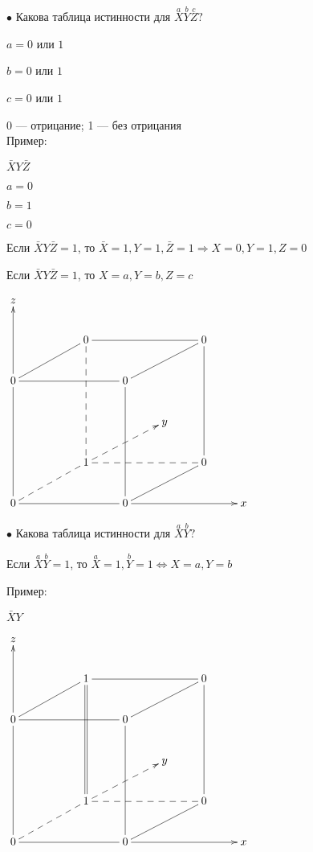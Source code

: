 \documentclass[a4paper, 12pt] {article}
\begin{document}
$ \bullet $ Какова таблица истинности для $ \stackrel{a}{X} \stackrel{b}{Y} \stackrel{c}{Z} ? $

$ a = 0 $ или $ 1 $

$ b = 0 $ или $ 1 $

$ c = 0 $ или $ 1 $

0 --- отрицание; 1 --- без отрицания\\

Пример:

$ \bar X Y \bar Z $

$ a = 0 $

$ b = 1 $

$ c = 0 $

Если $ \bar X Y \bar Z =1$, то $ \bar X =1, Y =1, \bar Z =1 \Rightarrow X =0, Y =1, Z =0 $

Если $ \bar X Y \bar Z =1$, то $ X =a, Y =b, Z =c $

$ 
\begin{matrix}
	\xymatrix{
		z &   &  &   & & &\\
		&   & 0 \ar@{-}[lld] \ar@{--}[ddd] &   & & 0 \ar@{-}[lld] \ar@{-}[lll]&\\
		0 \ar@{->}[uu] \ar@{-}[rrr] &   &  & 0  & & &\\
		&   &  &   & y & &\\
		&   & 1 \ar@{--}[lld] \ar@{-->}[rru] \ar@{--}[rrr] &   & & 0 \ar@{-}[uuu]  &\\
		0  \ar@{-}[uuu] \ar@{-}[rrr] & & & 0 \ar@{->}[rrr] \ar@{-}[uuu] \ar@{-}[rru] & & & x \\
	}
\end{matrix}
$

\newpage

$ \bullet $ Какова таблица истинности для $ \stackrel{a}{X} \stackrel{b}{Y}? $

Если $ \stackrel{a}{X} \stackrel{b}{Y} =1$, то $ \stackrel{a}{X}=1, \stackrel{b}{Y}=1 \Leftrightarrow  X =a, Y =b $

Пример:

$ \bar X Y $

$ 
\begin{matrix}
	\xymatrix{
		z &   &  &   & & &\\
		&   & 1 \ar@{-}[lld] \ar@{=}[ddd] &   & & 0 \ar@{-}[lld] \ar@{-}[lll]&\\
		0 \ar@{->}[uu] \ar@{-}[rrr] &   &  & 0  & & &\\
		&   &  &   & y & &\\
		&   & 1 \ar@{--}[lld] \ar@{-->}[rru] \ar@{--}[rrr] &   & & 0 \ar@{-}[uuu]  &\\
		0  \ar@{-}[uuu] \ar@{-}[rrr] & & & 0 \ar@{->}[rrr] \ar@{-}[uuu] \ar@{-}[rru] & & & x \\
	}
\end{matrix}
$\\                                                                                                   
\end{document}
